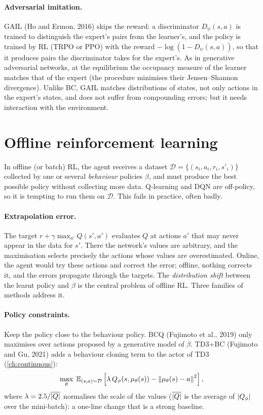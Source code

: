\paragraph{Adversarial imitation.} GAIL (Ho and Ermon, 2016) skips the
reward: a discriminator $D_\psi(s, a)$ is trained to distinguish the
expert's pairs from the learner's, and the policy is trained by RL (TRPO or
PPO) with the reward $-\log(1 - D_\psi(s, a))$, so that it produces pairs
the discriminator takes for the expert's. As in generative adversarial
networks, at the equilibrium the occupancy measure of the learner matches
that of the expert (the procedure minimises their Jensen--Shannon
divergence). Unlike BC, GAIL matches distributions of states, not only
actions in the expert's states, and does not suffer from compounding
errors; but it needs interaction with the environment.

\section{Offline reinforcement learning}

In offline (or batch) RL, the agent receives a dataset $\mathcal{D} =
\{(s_i, a_i, r_i, s'_i)\}$ collected by one or several \emph{behaviour}
policies $\beta$, and must produce the best possible policy without
collecting more data. Q-learning and DQN are off-policy, so it is tempting
to run them on $\mathcal{D}$. This fails in practice, often badly.

\paragraph{Extrapolation error.} The target $r + \gamma \max_{a'} Q(s',
a')$ evaluates $Q$ at actions $a'$ that may never appear in the data for
$s'$. There the network's values are arbitrary, and the maximisation
selects precisely the actions whose values are overestimated. Online, the
agent would try these actions and correct the error; offline, nothing
corrects it, and the errors propagate through the targets. The
\emph{distribution shift} between the learnt policy and $\beta$ is the
central problem of offline RL. Three families of methods address it.

\paragraph{Policy constraints.} Keep the policy close to the behaviour
policy. BCQ (Fujimoto et al., 2019) only maximises over actions proposed by
a generative model of $\beta$. TD3+BC (Fujimoto and Gu, 2021) adds a
behaviour cloning term to the actor of TD3 (\cref{ch:continuous}):
\begin{equation}
  \max_\theta\; \mathbb{E}_{(s, a) \sim \mathcal{D}}\left[ \lambda\, Q_\phi(s,
  \mu_\theta(s)) - \left\lVert \mu_\theta(s) - a \right\rVert^2 \right],
\end{equation}
where $\lambda = 2.5 / \overline{\left\lvert Q \right\rvert}$ normalises the scale of the
values ($\overline{\left\lvert Q \right\rvert}$ is the average of $\left\lvert Q_\phi \right\rvert$ over the
mini-batch): a one-line change that is a strong baseline.

